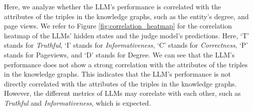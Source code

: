 Here, we analyze whether the LLM's performance is correlated with the attributes of the triples in the knowledge graphs, such as the entity's degree, and page views. 
We refer to Figure \ref{fig:correlation_heatmap} for the correlation heatmap of the LLMs' hidden states and the judge model's predictions. Here, `T' stands for \textit{Truthful}, `I' stands for \textit{Informativeness}, `C' stands for \textit{Correctness}, `P' stands for Pageviews, and `D' stands for Degree. 
 We can see that the LLM's performance does not show a strong correlation with the attributes of the triples in the knowledge graphs. This indicates that the LLM's performance is not directly correlated with the attributes of the triples in the knowledge graphs. However, the different metrics of LLMs may correlate with each other, such as \textit{Truthful} and \textit{Informativeness}, which is expected. 



